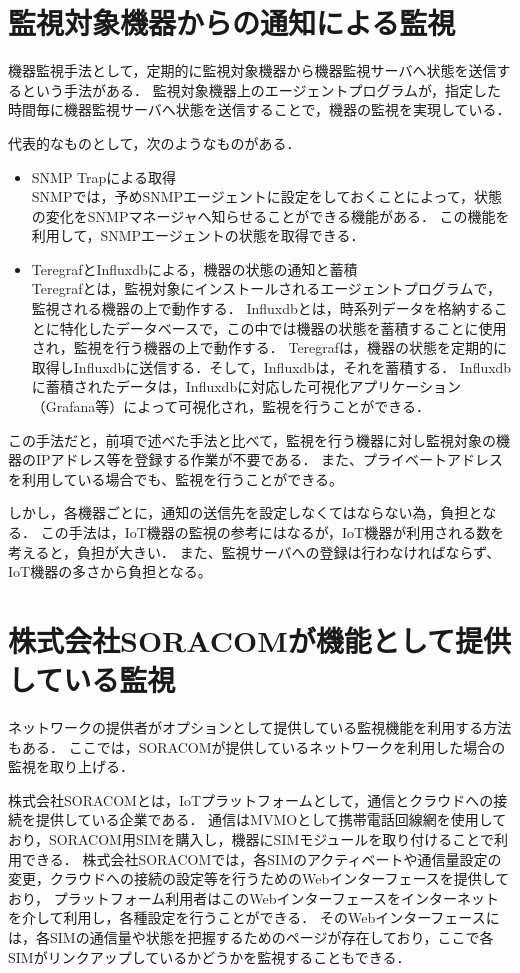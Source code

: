 \section{監視対象機器からの通知による監視}
	機器監視手法として，定期的に監視対象機器から機器監視サーバへ状態を送信するという手法がある．
	監視対象機器上のエージェントプログラムが，指定した時間毎に機器監視サーバへ状態を送信することで，機器の監視を実現している．
	\medskip
	
	代表的なものとして，次のようなものがある．
	\begin{itemize}
		\item SNMP Trapによる取得\\
			SNMPでは，予めSNMPエージェントに設定をしておくことによって，状態の変化をSNMPマネージャへ知らせることができる機能がある．
			この機能を利用して，SNMPエージェントの状態を取得できる．
		\item TeregrafとInfluxdbによる，機器の状態の通知と蓄積\\
			Teregrafとは，監視対象にインストールされるエージェントプログラムで，監視される機器の上で動作する．
			Influxdbとは，時系列データを格納することに特化したデータベースで，この中では機器の状態を蓄積することに使用され，監視を行う機器の上で動作する．
			Teregrafは，機器の状態を定期的に取得しInfluxdbに送信する．そして，Influxdbは，それを蓄積する．
			Influxdbに蓄積されたデータは，Influxdbに対応した可視化アプリケーション（Grafana等）によって可視化され，監視を行うことができる．
	\end{itemize}
	
	この手法だと，前項で述べた手法と比べて，監視を行う機器に対し監視対象の機器のIPアドレス等を登録する作業が不要である．
	また、プライベートアドレスを利用している場合でも、監視を行うことができる。

	しかし，各機器ごとに，通知の送信先を設定しなくてはならない為，負担となる．
	この手法は，IoT機器の監視の参考にはなるが，IoT機器が利用される数を考えると，負担が大きい．
	また、監視サーバへの登録は行わなければならず、IoT機器の多さから負担となる。

\section{株式会社SORACOMが機能として提供している監視} %
	ネットワークの提供者がオプションとして提供している監視機能を利用する方法もある．
	ここでは，SORACOMが提供しているネットワークを利用した場合の監視を取り上げる．
	
	株式会社SORACOMとは，IoTプラットフォームとして，通信とクラウドへの接続を提供している企業である．
	通信はMVMOとして携帯電話回線網を使用しており，SORACOM用SIMを購入し，機器にSIMモジュールを取り付けることで利用できる．
	株式会社SORACOMでは，各SIMのアクティベートや通信量設定の変更，クラウドへの接続の設定等を行うためのWebインターフェースを提供しており，
	プラットフォーム利用者はこのWebインターフェースをインターネットを介して利用し，各種設定を行うことができる．
	そのWebインターフェースには，各SIMの通信量や状態を把握するためのページが存在しており，ここで各SIMがリンクアップしているかどうかを監視することもできる．

